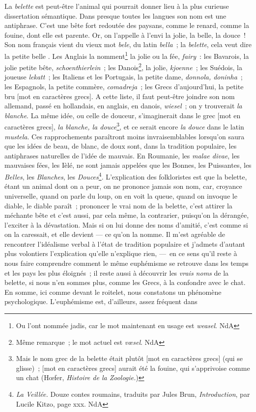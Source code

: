 \documentclass[french,twoside]{book} %
\def\mednobreak{\ifdim\lastskip<\medskipamount
  \removelastskip\nopagebreak\medskip\fi}
\newcommand{\labelblock}[1]{\medbreak{\noindent\color{rubric}\bfseries #1}\par\mednobreak}
\begin{document}
\labelblock{{\itshape Belette.}}

\noindent La {\itshape belette} est peut-être l’animal qui pourrait donner lieu à la plus curieuse dissertation sémantique. Dans presque toutes les langues son nom est une antiphrase. C’est une bête fort redoutée des paysans, comme le renard, comme la fouine, dont elle est parente. Or, on l’appelle à l’envi la jolie, la belle, la douce ! Son nom français vient du vieux mot {\itshape bele}, du latin {\itshape bella} ; la {\itshape belette}, cela veut dire la petite belle . Les Anglais la nomment\footnote{ Ou l’ont nommée jadis, car le mot maintenant en usage est {\itshape weasel}. NdA} la jolie ou la fée, {\itshape fairy} : les Bavarois, la jolie petite bête, {\itshape schoenthierlein} ; les Danois\footnote{ Même remarque ; le mot actuel est {\itshape vœsel}. NdA}, la jolie, {\itshape kjoenne} ; les Suédois, la joueuse {\itshape lekatt} ; les Italiens et les Portugais, la petite dame, {\itshape donnola, doninha} ; les Espagnols, la petite commère, {\itshape comadreja} ; les Grecs d’aujourd’hui, la petite bru [mot en caractères grecs]. A cette liste, il faut peut-être joindre son nom allemand, passé en hollandais, en anglais, en danois, {\itshape wiesel} ; on y trouverait {\itshape la blanche}. La même idée, ou celle de douceur, s’imaginerait dans le grec [mot en caractères grecs], {\itshape la blanche, la douce}\footnote{ Mais le nom grec de la belette était plutôt [mot en caractères grecs] (qui se glisse) ; [mot en caractères grecs] aurait été la fouine, qui s’apprivoise comme un chat (Hœfer, {\itshape Histoire de la Zoologie.})}, et ce serait encore {\itshape la douce} dans le latin {\itshape mustela}. Ces rapprochements paraîtront moins invraisemblables lorsqu’on saura que les idées de beau, de blanc, de doux sont, dans la tradition populaire, les antiphrases naturelles de l’idée de mauvais. En Roumanie, les {\itshape malae divae}, les mauvaises fées, les Ièlé, ne sont jamais appelées que les Bonnes, les Puissantes, les {\itshape Belles}, les {\itshape Blanches}, les {\itshape Douces}\footnote{ {\itshape La Veillée.} Douze contes roumains, traduits par Jules Brun, {\itshape Introduction}, par Lucile Kitzo, page xxx. NdA}. L’explication des folkloristes est que la belette, étant un animal dont on a peur, on ne prononce jamais son nom, car, croyance universelle, quand on parle du loup, on en voit la queue, quand on invoque le diable, le diable paraît ; prononcer le vrai nom de la belette, c’est attirer la méchante bête et c’est aussi, par cela même, la contrarier, puisqu’on la dérangée, l’exciter à la dévastation. Mais si on lui donne des noms d’amitié, c’est comme si on la caressait, et elle devient — ce qu’on la nomme. Il m’est agréable de rencontrer l’idéalisme verbal à l’état de tradition populaire et j’admets d’autant plus volontiers l’explication qu’elle n’explique rien, — en ce sens qu’il reste à nous faire comprendre comment le même euphémisme se retrouve dans les temps et les pays les plus éloignés ; il reste aussi à découvrir les {\itshape vrais noms} de la belette, si nous n’en sommes plus, comme les Grecs, à la confondre avec le chat. En somme, ici comme devant le roitelet, nous constatons un phénomène psychologique. L’euphémisme est, d’ailleurs, assez fréquent dans 
\end{document}
